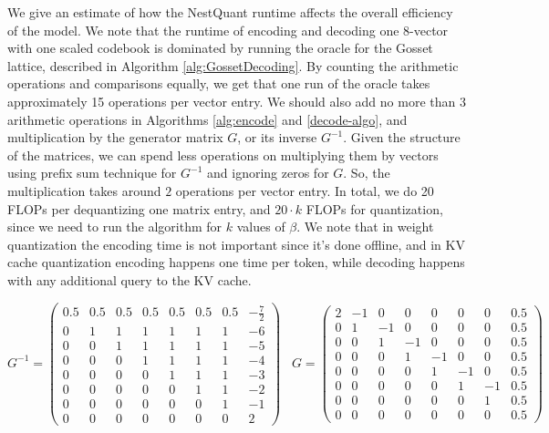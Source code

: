 We give an estimate of how the NestQuant runtime affects the overall efficiency of the model. We note that the runtime of encoding and decoding one 8-vector with one scaled codebook is dominated by running the oracle for the Gosset lattice, described in Algorithm \ref{alg:GossetDecoding}. By counting the arithmetic operations and comparisons equally, we get that one run of the oracle takes approximately 15 operations per vector entry. We should also add no more than $3$ arithmetic operations in Algorithms \ref{alg:encode} and \ref{decode-algo}, and multiplication by the generator matrix $G$, or its inverse $G^{-1}$. Given the structure of the matrices, we can spend less operations on multiplying them by vectors using prefix sum technique for $G^{-1}$ and ignoring zeros for $G$. So, the multiplication takes around $2$ operations per vector entry. In total, we do 20 FLOPs per dequantizing one matrix entry, and $20 \cdot k$ FLOPs for quantization, since we need to run the algorithm for $k$ values of $\beta$. We note that in weight quantization the encoding time is not important since it's done offline, and in KV cache quantization encoding happens one time per token, while decoding happens with any additional query to the KV cache.

\begin{equation}
G^{-1}
=
\begin{pmatrix}
0.5 & 0.5 & 0.5 & 0.5 & 0.5 & 0.5 & 0.5 & -\tfrac{7}{2} \\
0 & 1 & 1 & 1 & 1 & 1 & 1 & -6 \\
0 & 0 & 1 & 1 & 1 & 1 & 1 & -5 \\
0 & 0 & 0 & 1 & 1 & 1 & 1 & -4 \\
0 & 0 & 0 & 0 & 1 & 1 & 1 & -3 \\
0 & 0 & 0 & 0 & 0 & 1 & 1 & -2 \\
0 & 0 & 0 & 0 & 0 & 0 & 1 & -1 \\
0 & 0 & 0 & 0 & 0 & 0 & 0 & 2
\end{pmatrix} \; \; \;
G 
=
\begin{pmatrix}
2 & -1 & 0 & 0 & 0 & 0 & 0 & 0.5 \\
0 & 1 & -1 & 0 & 0 & 0 & 0 & 0.5 \\
0 & 0 & 1 & -1 & 0 & 0 & 0 & 0.5 \\
0 & 0 & 0 & 1 & -1 & 0 & 0 & 0.5 \\
0 & 0 & 0 & 0 & 1 & -1 & 0 & 0.5 \\
0 & 0 & 0 & 0 & 0 & 1 & -1 & 0.5 \\
0 & 0 & 0 & 0 & 0 & 0 & 1 & 0.5 \\
0 & 0 & 0 & 0 & 0 & 0 & 0 & 0.5
\end{pmatrix}
\end{equation}

